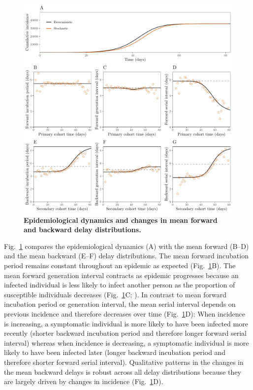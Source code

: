 \documentclass[12pt]{article}
\newcommand{\fref}[1]{Fig.~\ref{fig:#1}}
\begin{document}
\begin{figure}[!ht]
\includegraphics[width=\textwidth]{forward.pdf}
\caption{
\textbf{Epidemiological dynamics and changes in mean forward and backward delay distributions.}
}
\label{fig:epi}
\end{figure}

\fref{epi} compares the epidemiological dynamics (A) with the mean forward (B--D) and the mean backward (E--F) delay distributions.
The mean forward incubation period remains constant throughout an epidemic as expected (\fref{epi}B).
The mean forward generation interval contracts as epidemic progresses because an infected individual is less likely to infect another person as the proportion of susceptible individuals decreases (\fref{epi}C; \cite{champredon2015intrinsic}).
In contrast to mean forward incubation period or generation interval, the mean serial interval depends on previous incidence and therefore decreases over time (\fref{epi}D):
When incidence is increasing, a symptomatic individual is more likely to have been infected more recently (shorter backward incubation period and therefore longer forward serial interval) whereas when incidence is decreasing, a symptomatic individual is more likely to have been infected later (longer backward incubation period and therefore shorter forward serial interval).
Qualitative patterns in the changes in the mean backward delays is robust across all delay distributions because they are largely driven by changes in incidence (\fref{epi}D).
\end{document}
